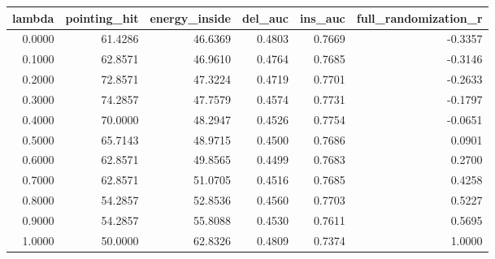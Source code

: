 \begin{tabular}{rrrrrr}
\toprule
lambda & pointing_hit & energy_inside & del_auc & ins_auc & full_randomization_r \\
\midrule
0.0000 & 61.4286 & 46.6369 & 0.4803 & 0.7669 & -0.3357 \\
0.1000 & 62.8571 & 46.9610 & 0.4764 & 0.7685 & -0.3146 \\
0.2000 & 72.8571 & 47.3224 & 0.4719 & 0.7701 & -0.2633 \\
0.3000 & 74.2857 & 47.7579 & 0.4574 & 0.7731 & -0.1797 \\
0.4000 & 70.0000 & 48.2947 & 0.4526 & 0.7754 & -0.0651 \\
0.5000 & 65.7143 & 48.9715 & 0.4500 & 0.7686 & 0.0901 \\
0.6000 & 62.8571 & 49.8565 & 0.4499 & 0.7683 & 0.2700 \\
0.7000 & 62.8571 & 51.0705 & 0.4516 & 0.7685 & 0.4258 \\
0.8000 & 54.2857 & 52.8536 & 0.4560 & 0.7703 & 0.5227 \\
0.9000 & 54.2857 & 55.8088 & 0.4530 & 0.7611 & 0.5695 \\
1.0000 & 50.0000 & 62.8326 & 0.4809 & 0.7374 & 1.0000 \\
\bottomrule
\end{tabular}
